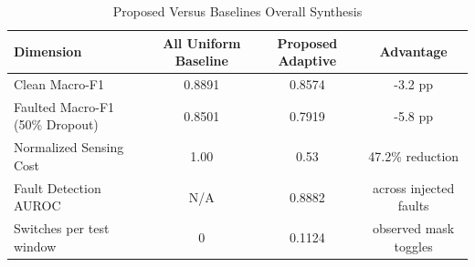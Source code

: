 \begin{table}[htbp]
\caption{Proposed Versus Baselines Overall Synthesis}
\label{tab:overall_synthesis}
\centering
\begin{tabular}{lccc}
\hline
Dimension & All Uniform Baseline & Proposed Adaptive & Advantage \\ \hline
Clean Macro-F1 & 0.8891 & 0.8574 & -3.2 pp \\
Faulted Macro-F1 (50\% Dropout) & 0.8501 & 0.7919 & -5.8 pp \\
Normalized Sensing Cost & 1.00 & 0.53 & 47.2\% reduction \\
Fault Detection AUROC & N/A & 0.8882 & across injected faults \\
Switches per test window & 0 & 0.1124 & observed mask toggles \\
\hline
\end{tabular}
\end{table}

